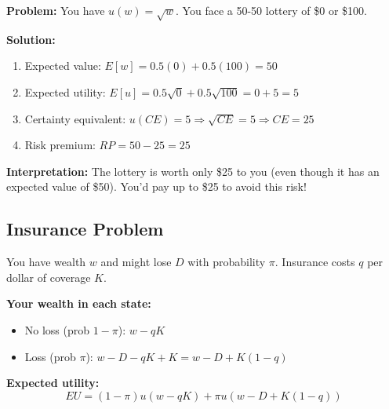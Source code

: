 \documentclass[11pt]{article}
\begin{document}
\begin{example}
\textbf{Problem:} You have $u(w) = \sqrt{w}$. You face a 50-50 lottery of \$0 or \$100.

\textbf{Solution:}
\begin{enumerate}
    \item Expected value: $E[w] = 0.5(0) + 0.5(100) = 50$
    \item Expected utility: $E[u] = 0.5\sqrt{0} + 0.5\sqrt{100} = 0 + 5 = 5$
    \item Certainty equivalent: $u(CE) = 5 \Rightarrow \sqrt{CE} = 5 \Rightarrow CE = 25$
    \item Risk premium: $RP = 50 - 25 = 25$
\end{enumerate}

\textbf{Interpretation:} The lottery is worth only \$25 to you (even though it has an expected value of \$50). You'd pay up to \$25 to avoid this risk!
\end{example}

\subsection{Insurance Problem}

You have wealth $w$ and might lose $D$ with probability $\pi$. Insurance costs $q$ per dollar of coverage $K$.

\textbf{Your wealth in each state:}
\begin{itemize}
    \item No loss (prob $1-\pi$): $w - qK$
    \item Loss (prob $\pi$): $w - D - qK + K = w - D + K(1-q)$
\end{itemize}

\textbf{Expected utility:}
$$EU = (1-\pi) u(w - qK) + \pi u(w - D + K(1-q))$$

\begin{center}
\end{center}
\end{document}

